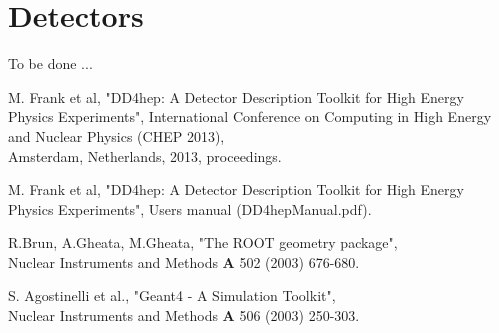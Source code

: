 \documentclass[10pt,a4paper]{article}
\begin{document}
\section{Detectors}
\label{sec:ddrec-manual-detectors}
To be done ...



\newpage
\begin{thebibliography}{9}
 M. Frank et al, "DD4hep: A Detector Description Toolkit 
                for High Energy Physics Experiments",
                International Conference on Computing in High Energy and Nuclear Physics  
                (CHEP 2013), \\
                Amsterdam, Netherlands, 2013, proceedings.
                
 M. Frank et al, "DD4hep: A Detector Description Toolkit 
                for High Energy Physics Experiments", Users manual (DD4hepManual.pdf).
                

 R.Brun, A.Gheata, M.Gheata, "The ROOT geometry package",\\
                    Nuclear Instruments and Methods {\bf{A}} 502 (2003) 676-680.

  S. Agostinelli et al., 
                   "Geant4 - A Simulation Toolkit", \\
                    Nuclear Instruments and Methods {\bf{A}} 506 (2003) 250-303.

\end{thebibliography}
\end{document}
